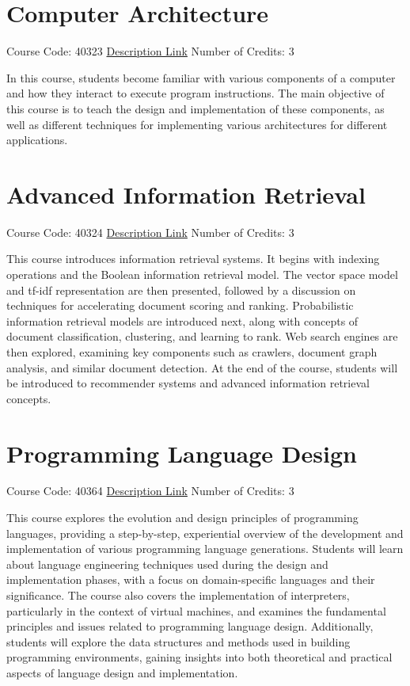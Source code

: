 \section{Computer Architecture}
Course Code: 40323 \qquad \quad \href{https://docs.ce.sharif.edu/course/40323}{Description Link}
\qquad \quad Number of Credits: 3

In this course, students become familiar with various components of a computer and how they interact to execute program instructions. The main objective of this course is to teach the design and implementation of these components, as well as different techniques for implementing various architectures for different applications.

\section{Advanced Information Retrieval}
Course Code: 40324 \qquad \quad \href{https://docs.ce.sharif.edu/course/40324}{Description Link}
\qquad \quad Number of Credits: 3

This course introduces information retrieval systems. It begins with indexing operations and the Boolean information retrieval model. The vector space model and tf-idf representation are then presented, followed by a discussion on techniques for accelerating document scoring and ranking. Probabilistic information retrieval models are introduced next, along with concepts of document classification, clustering, and learning to rank. Web search engines are then explored, examining key components such as crawlers, document graph analysis, and similar document detection. At the end of the course, students will be introduced to recommender systems and advanced information retrieval concepts.

\section{Programming Language Design}
Course Code: 40364 \qquad \quad \href{https://docs.ce.sharif.edu/course/40364}{Description Link}
\qquad \quad Number of Credits: 3

This course explores the evolution and design principles of programming languages, providing a step-by-step, experiential overview of the development and implementation of various programming language generations. Students will learn about language engineering techniques used during the design and implementation phases, with a focus on domain-specific languages and their significance. The course also covers the implementation of interpreters, particularly in the context of virtual machines, and examines the fundamental principles and issues related to programming language design. Additionally, students will explore the data structures and methods used in building programming environments, gaining insights into both theoretical and practical aspects of language design and implementation.

